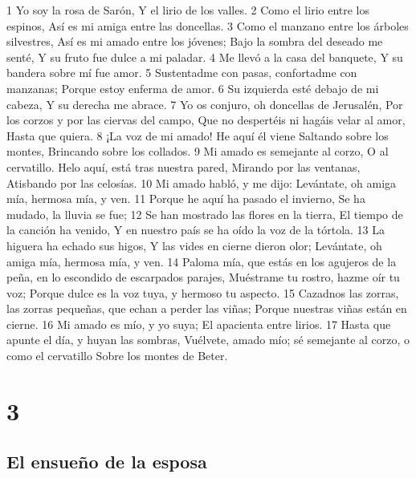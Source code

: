 1 Yo soy la rosa de Sarón,
Y el lirio de los valles.
2 Como el lirio entre los espinos,
Así es mi amiga entre las doncellas.
3 Como el manzano entre los árboles silvestres,
Así es mi amado entre los jóvenes;
Bajo la sombra del deseado me senté,
Y su fruto fue dulce a mi paladar.
4 Me llevó a la casa del banquete,
Y su bandera sobre mí fue amor.
5 Sustentadme con pasas, confortadme con manzanas;
Porque estoy enferma de amor.
6 Su izquierda esté debajo de mi cabeza,
Y su derecha me abrace.
7 Yo os conjuro, oh doncellas de Jerusalén,
Por los corzos y por las ciervas del campo,
Que no despertéis ni hagáis velar al amor,
Hasta que quiera.
8 ¡La voz de mi amado! He aquí él viene
Saltando sobre los montes,
Brincando sobre los collados.
9 Mi amado es semejante al corzo,
O al cervatillo.
Helo aquí, está tras nuestra pared,
Mirando por las ventanas,
Atisbando por las celosías.
10 Mi amado habló, y me dijo:
Levántate, oh amiga mía, hermosa mía, y ven.
11 Porque he aquí ha pasado el invierno,
Se ha mudado, la lluvia se fue;
12 Se han mostrado las flores en la tierra,
El tiempo de la canción ha venido,
Y en nuestro país se ha oído la voz de la tórtola.
13 La higuera ha echado sus higos,
Y las vides en cierne dieron olor;
Levántate, oh amiga mía, hermosa mía, y ven.
14 Paloma mía, que estás en los agujeros de la peña, en lo escondido de escarpados parajes,
Muéstrame tu rostro, hazme oír tu voz;
Porque dulce es la voz tuya, y hermoso tu aspecto.
15 Cazadnos las zorras, las zorras pequeñas, que echan a perder las viñas;
Porque nuestras viñas están en cierne.
16 Mi amado es mío, y yo suya;
El apacienta entre lirios.
17 Hasta que apunte el día, y huyan las sombras,
Vuélvete, amado mío; sé semejante al corzo, o como el cervatillo
Sobre los montes de Beter. 

\chapter{3}

\section*{El ensueño de la esposa}

